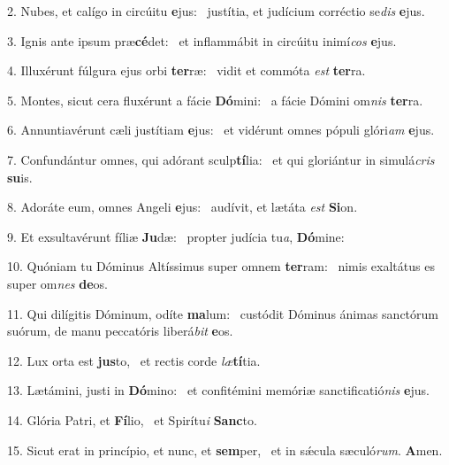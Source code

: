 2. Nubes, et calígo in circúitu \textbf{e}jus: \ast\  justítia, et judícium corréctio se\textit{dis} \textbf{e}jus.\

3. Ignis ante ipsum præ\textbf{cé}det: \ast\  et inflammábit in circúitu inimí\textit{cos} \textbf{e}jus.\

4. Illuxérunt fúlgura ejus orbi \textbf{ter}ræ: \ast\  vidit et commóta \textit{est} \textbf{ter}ra.\

5. Montes, sicut cera fluxérunt a fácie \textbf{Dó}mini: \ast\  a fácie Dómini om\textit{nis} \textbf{ter}ra.\

6. Annuntiavérunt cæli justítiam \textbf{e}jus: \ast\  et vidérunt omnes pópuli glóri\textit{am} \textbf{e}jus.\

7. Confundántur omnes, qui adórant sculp\textbf{tí}lia: \ast\  et qui gloriántur in simulá\textit{cris} \textbf{su}is.\

8. Adoráte eum, omnes Angeli \textbf{e}jus: \ast\  audívit, et lætáta \textit{est} \textbf{Si}on.\

9. Et exsultavérunt fíliæ \textbf{Ju}dæ: \ast\  propter judícia tu\textit{a}, \textbf{Dó}mine:\

10. Quóniam tu Dóminus Altíssimus super omnem \textbf{ter}ram: \ast\  nimis exaltátus es super om\textit{nes} \textbf{de}os.\

11. Qui dilígitis Dóminum, odíte \textbf{ma}lum: \ast\  custódit Dóminus ánimas sanctórum suórum, de manu peccatóris liberá\textit{bit} \textbf{e}os.\

12. Lux orta est \textbf{jus}to, \ast\  et rectis corde \textit{læ}\textbf{tí}tia.\

13. Lætámini, justi in \textbf{Dó}mino: \ast\  et confitémini memóriæ sanctificatió\textit{nis} \textbf{e}jus.\

14. Glória Patri, et \textbf{Fí}lio, \ast\  et Spirítu\textit{i} \textbf{Sanc}to.\

15. Sicut erat in princípio, et nunc, et \textbf{sem}per, \ast\  et in sǽcula sæculó\textit{rum}. \textbf{A}men.\

